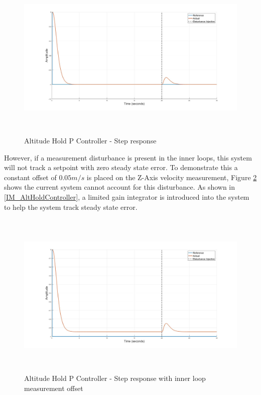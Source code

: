 \documentclass[12pt]{report}
\begin{document}
	\begin{figure}[H]
		\centering
		\includegraphics[height = 8cm]{../Design/Matlab/Controllers/altitude_step_p_no_dist.jpg}
		\caption{Altitude Hold P Controller -  Step response}
		\label{IM_AltHoldStep}
	\end{figure}
	
	However, if a measurement disturbance is present in the inner loops, this system will not track a setpoint with zero steady state error. To demonstrate this a constant offset of $0.05m/s$ is placed on the Z-Axis velocity measurement, Figure \ref{IM_AltHoldPDistStep} shows the current system cannot account for this disturbance. As shown in \ref{IM_AltHoldController}, a limited gain integrator is introduced into the system to help the system track steady state error. 
	
	\begin{figure}[H]
		\centering
		\includegraphics[height = 8cm]{../Design/Matlab/Controllers/altitude_step_p_dist.jpg}
		\caption{Altitude Hold P Controller -  Step response with inner loop measurement offset}
		\label{IM_AltHoldPDistStep}
	\end{figure}
	
\end{document}
